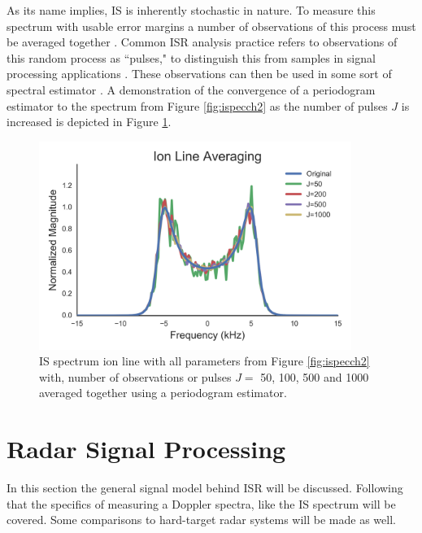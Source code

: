 As its name implies, IS is inherently stochastic in nature. To measure this spectrum with usable error margins a number of observations of this process must be averaged together \cite{Diaz:2008co}. Common ISR analysis practice refers to observations of this random process as ``pulses," to distinguish this from samples in signal processing applications \cite{dtsp:openhiem}. These observations can then be used in some sort of spectral estimator . A demonstration of the convergence of a periodogram estimator to the spectrum from Figure \ref{fig:ispecch2} as the number of pulses $J$ is increased is depicted in Figure \ref{fig:ispecch2ave}.
\begin{figure}[htb]
\centering
\includegraphics[width=4in]{Specionave}
\caption{IS spectrum ion line with all parameters from Figure \ref{fig:ispecch2} with, number of observations or pulses $J =$ 50, 100, 500 and 1000 averaged together using a periodogram estimator. }
\label{fig:ispecch2ave}
\end{figure}

\section{Radar Signal Processing}

In this section the general signal model behind ISR will be discussed. Following that the specifics of measuring a Doppler spectra, like the IS spectrum will be covered. Some comparisons to hard-target radar systems will be made as well.

